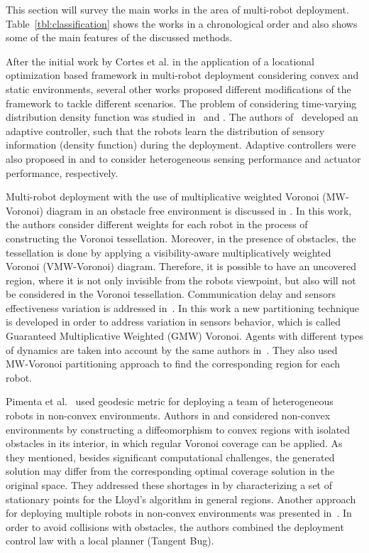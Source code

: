 \documentclass[smallcondensed]{svjour3}
\begin{document}
This section will survey the main works in the area of multi-robot deployment. Table~\ref{tbl:classification} shows the works in a chronological order and also shows some of the main features of the discussed methods.

After the initial work by Cortes et al. \cite{Cortes2004} in the application of a locational optimization based framework in multi-robot deployment considering convex and static environments, several other works proposed different modifications of the framework to tackle different scenarios. 
%	
The problem of considering time-varying distribution density function was studied in~\cite{Pimenta2088SCAT} and \cite{sung2015}. The authors of~\cite{Schwager2009} developed an adaptive controller, such that the robots learn the distribution of sensory information (density function) during the deployment. Adaptive controllers were also proposed in \citep{pierson2013adaptive} and \citep{Pierson2015} to consider heterogeneous sensing performance and actuator performance, respectively.
%

Multi-robot deployment with the use of multiplicative weighted Voronoi (MW-Voronoi) diagram in an obstacle free environment is discussed in \cite{Mahboubi2012}. In this work, the authors consider different weights for each robot in the process of constructing the Voronoi tessellation. Moreover, in the presence of obstacles, the tessellation is done by applying a visibility-aware multiplicatively weighted Voronoi (VMW-Voronoi) diagram. Therefore, it is possible to have an uncovered region, where it is not only invisible from the robots viewpoint, but also will not be considered in the Voronoi tessellation.
%
Communication delay and sensors effectiveness variation is addressed in~\cite{Sharifi2014}. In this work a new partitioning technique is developed in order to address variation in sensors behavior, which is called Guaranteed Multiplicative Weighted (GMW) Voronoi.
%
Agents with different types of dynamics are taken into account by the same authors in~\cite{Sharifi2015}. They also used MW-Voronoi partitioning approach to find the corresponding region for each robot.

Pimenta et al.~\cite{Pimenta2008} used geodesic metric for deploying a team of heterogeneous robots in non-convex environments. Authors in \cite{Caicedo2008} and \cite{nunez2008} considered non-convex environments by constructing a diffeomorphism to convex regions with isolated obstacles in its interior, in which regular Voronoi coverage can be applied. As they mentioned, besides significant computational challenges, the generated solution may differ from the corresponding optimal coverage solution in the original space. They addressed these shortages in \cite{Caicedo2008} by characterizing a set of stationary points for the Lloyd's algorithm in general regions.
Another approach for deploying multiple robots in non-convex environments was presented in~\cite{Breitenmoser2010}. In order to avoid collisions with obstacles, the authors combined the deployment control law with a local planner (Tangent Bug).
\end{document}
